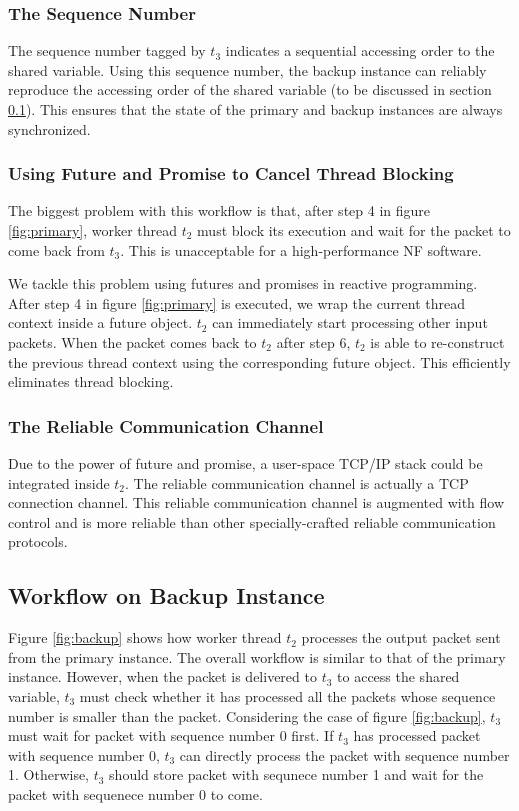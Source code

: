 \subsubsection{The Sequence Number}

The sequence number tagged by $t_3$ indicates a sequential accessing order to
the shared variable. Using this sequence number, the backup instance can
reliably reproduce the accessing order of the shared variable (to be discussed
in section \ref{sec:backup}). This ensures that the state of the primary and backup
instances are always synchronized.

\subsubsection{Using Future and Promise to Cancel Thread Blocking}

The biggest problem with this workflow is that, after step 4 in figure
\ref{fig:primary}, worker thread $t_2$ must block its execution and wait for the
packet to come back from $t_3$. This is unacceptable for a high-performance NF
software.

We tackle this problem using futures and promises in reactive
programming. After step 4 in figure \ref{fig:primary} is executed, we wrap the
current thread context inside a future object. $t_2$ can immediately start processing
other input packets. When the packet comes back to $t_2$ after step
6, $t_2$ is able to re-construct the previous thread context using the
corresponding future object. This efficiently eliminates thread blocking.

\subsubsection{The Reliable Communication Channel}

Due to the power of future and promise, a user-space TCP/IP stack could be
integrated inside $t_2$. The reliable communication channel is actually a TCP
connection channel. This reliable communication channel is augmented with flow
control and is more reliable than other specially-crafted reliable communication protocols. 

\subsection {Workflow on Backup Instance}
\label{sec:backup}

Figure \ref{fig:backup} shows how worker thread $t_2$ processes the output
packet sent from the primary instance. The overall workflow is similar to that
of the primary instance. However, when the packet is delivered to $t_3$ to
access the shared variable, $t_3$ must check whether it has processed all the
packets whose sequence number is smaller than the packet. Considering the case
of figure \ref{fig:backup}, $t_3$ must wait for packet with sequence number 0
first. If $t_3$ has processed packet with sequence number 0, $t_3$ can directly
process the packet with sequence number 1. Otherwise, $t_3$ should store packet with
sequnece number 1 and wait for the packet with sequenece number 0 to come.

